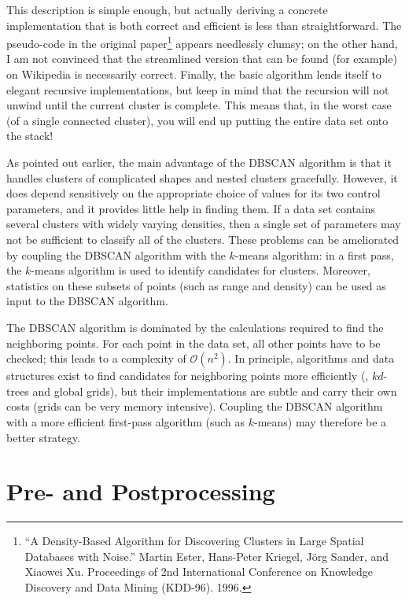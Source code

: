 This description is simple enough, but actually deriving a concrete
implementation that is both correct and efficient is less than
straightforward.  The pseudo-code in the original paper\footnote{``A
  Density-Based Algorithm for Discovering Clusters in Large Spatial
  Databases with Noise.'' Martin Ester, Hans-Peter Kriegel, J\"org
  Sander, and Xiaowei Xu. Proceedings of 2nd International Conference
  on Knowledge Discovery and Data Mining (KDD-96). 1996.}  appears
needlessly clumsy; on the other hand, I am not convinced that the
streamlined version that can be found (for example) on Wikipedia is
necessarily correct. Finally, the basic algorithm lends itself to
elegant recursive implementations, but keep in mind that the recursion
will not unwind until the current cluster is complete.  This means
that, in the worst case (of a single connected cluster), you will end
up putting the entire data set onto the stack!

As pointed out earlier, the main advantage of the DBSCAN algorithm is
that it handles clusters of complicated shapes and nested clusters
gracefully. However, it does depend sensitively on the appropriate
choice of values for its two control parameters, and it provides
little help in finding them. If a data set contains several clusters
with widely varying densities, then a single set of parameters may not
be sufficient to classify all of the clusters. These problems can be
ameliorated by coupling the DBSCAN algorithm with the $k$-means
algorithm: in a first pass, the $k$-means algorithm is used to
identify candidates for clusters. Moreover, statistics on these
subsets of points (such as range and density) can be used as input to
the DBSCAN algorithm.

The DBSCAN algorithm is dominated by the calculations required to find
the neighboring points. For each point in the data set, all other
points have to be checked; this leads to a complexity of
$\mathcal{O}(n^2)$. In principle, algorithms and data structures exist
to find candidates for neighboring points more efficiently (\eg,
$kd$-trees and global grids), but their implementations are subtle and
carry their own costs (grids can be very memory intensive). Coupling
the DBSCAN algorithm with a more efficient first-pass algorithm (such
as $k$-means) may therefore be a better strategy.


\section{Pre- and Postprocessing}

